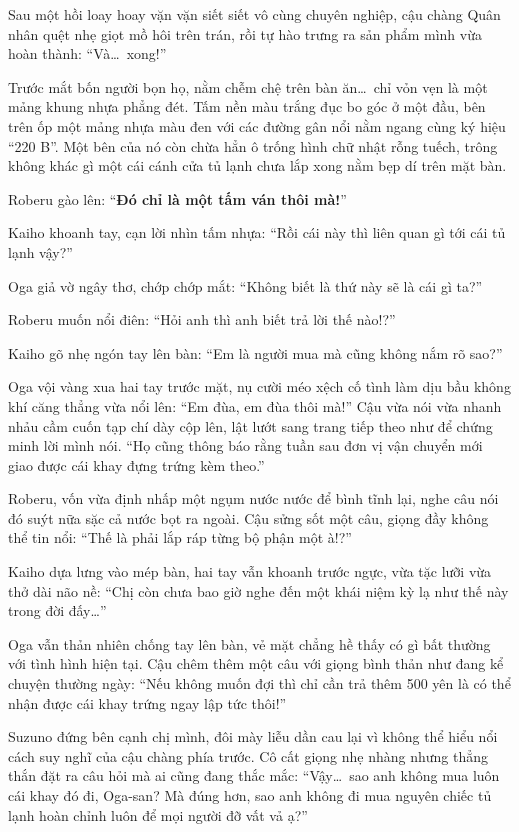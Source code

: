 \documentclass[../main.tex]{subfiles}
\begin{document}
Sau một hồi loay hoay vặn vặn siết siết vô cùng chuyên nghiệp, cậu chàng Quân nhân quệt nhẹ giọt mồ hôi trên trán, rồi tự hào trưng ra sản phẩm mình vừa hoàn thành: ``Và\dots\ xong!''

Trước mắt bốn người bọn họ, nằm chễm chệ trên bàn ăn\dots\ chỉ vỏn vẹn là một mảng khung nhựa phẳng đét. Tấm nền màu trắng đục bo góc ở một đầu, bên trên ốp một mảng nhựa màu đen với các đường gân nổi nằm ngang cùng ký hiệu ``220 B''. Một bên của nó còn chừa hẳn ô trống hình chữ nhật rỗng tuếch, trông không khác gì một cái cánh cửa tủ lạnh chưa lắp xong nằm bẹp dí trên mặt bàn.


Roberu gào lên: ``\textbf{Đó chỉ là một tấm ván thôi mà!}''

Kaiho khoanh tay, cạn lời nhìn tấm nhựa: ``Rồi cái này thì liên quan gì tới cái tủ lạnh vậy?''

Oga giả vờ ngây thơ, chớp chớp mắt: ``Không biết là thứ này sẽ là cái gì ta?''

Roberu muốn nổi điên: ``Hỏi anh thì anh biết trả lời thế nào!?''

Kaiho gõ nhẹ ngón tay lên bàn: ``Em là người mua mà cũng không nắm rõ sao?''

Oga vội vàng xua hai tay trước mặt, nụ cười méo xệch cố tình làm dịu bầu không khí căng thẳng vừa nổi lên: ``Em đùa, em đùa thôi mà!'' Cậu vừa nói vừa nhanh nhảu cầm cuốn tạp chí dày cộp lên, lật lướt sang trang tiếp theo như để chứng minh lời mình nói. ``Họ cũng thông báo rằng tuần sau đơn vị vận chuyển mới giao được cái khay đựng trứng kèm theo.''

Roberu, vốn vừa định nhấp một ngụm nước nước để bình tĩnh lại, nghe câu nói đó suýt nữa sặc cả nước bọt ra ngoài. Cậu sửng sốt một câu, giọng đầy không thể tin nổi: ``Thế là phải lắp ráp từng bộ phận một à!?''

Kaiho dựa lưng vào mép bàn, hai tay vẫn khoanh trước ngực, vừa tặc lưỡi vừa thở dài não nề: ``Chị còn chưa bao giờ nghe đến một khái niệm kỳ lạ như thế này trong đời đấy\dots''

Oga vẫn thản nhiên chống tay lên bàn, vẻ mặt chẳng hề thấy có gì bất thường với tình hình hiện tại. Cậu chêm thêm một câu với giọng bình thản như đang kể chuyện thường ngày: ``Nếu không muốn đợi thì chỉ cần trả thêm 500 yên là có thể nhận được cái khay trứng ngay lập tức thôi!''

Suzuno đứng bên cạnh chị mình, đôi mày liễu dần cau lại vì không thể hiểu nổi cách suy nghĩ của cậu chàng phía trước. Cô cất giọng nhẹ nhàng nhưng thẳng thắn đặt ra câu hỏi mà ai cũng đang thắc mắc: ``Vậy\dots\ sao anh không mua luôn cái khay đó đi, Oga-san? Mà đúng hơn, sao anh không đi mua nguyên chiếc tủ lạnh hoàn chỉnh luôn để mọi người đỡ vất vả ạ?''
\end{document}
